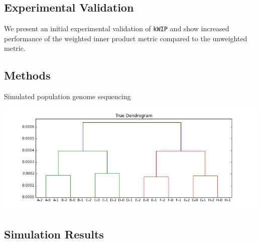 \documentclass[a0,portrait]{a0poster}
\begin{document}
\begin{multicols}{2}

\section*{Experimental Validation}

We present an initial experimental validation of \texttt{kWIP} and show
increased performance of the weighted inner product metric compared to the
unweighted metric.

\subsection*{Methods}

Simulated population genome sequencing


\begin{center}
  \vspace{1cm}
  \includegraphics[width=25cm]{true-dendro.png}
\end{center}

\subsection*{Simulation Results}


\end{multicols}
\end{document}
